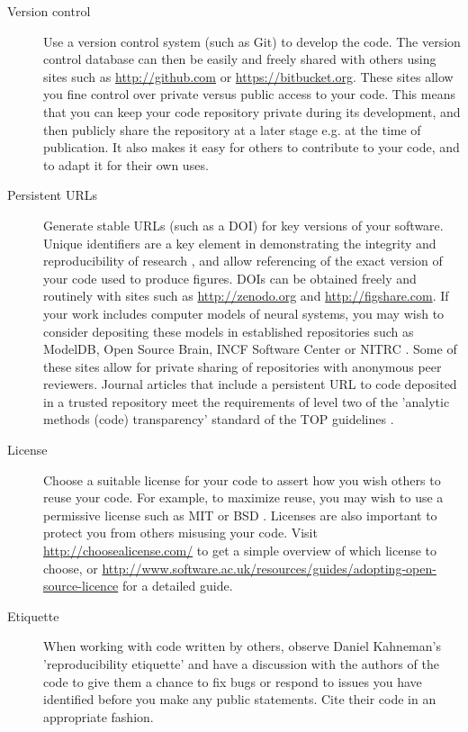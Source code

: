 \documentclass[11pt]{article}
\begin{document}
\begin{description}
\item [Version control] Use a version control system (such as Git) to
  develop the code.  The version control database can then be easily
  and freely shared with others using sites such as
  \url{http://github.com} \cite{Ram2013} or
  \url{https://bitbucket.org}.  These sites allow you fine control
  over private versus public access to your code.  This means that you
  can keep your code repository private during its development, and
  then publicly share the repository at a later stage e.g. at the time
  of publication. It also makes it easy for others to contribute to your code, and to adapt it for their own uses. 

\item [Persistent URLs] Generate stable URLs (such as a DOI) for key
  versions of your software.  Unique identifiers are a key element in
  demonstrating the integrity and reproducibility of research
  \cite{vasilevsky2013reproducibility}, and allow referencing of the 
  exact version of your code used to produce figures. DOIs can be
  obtained freely and routinely with sites such as
  \url{http://zenodo.org} and \url{http://figshare.com}.  If your work
  includes computer models of neural systems, you may wish to consider
  depositing these models in established repositories such as
  ModelDB\cite{modeldb}, Open Source Brain\cite{osb}, INCF
  Software Center\cite{web:incf-software} or NITRC
  \cite{poline_software_2014}. Some of these sites allow for private
  sharing of repositories with anonymous peer reviewers. Journal
  articles that include a persistent URL to code deposited in a
  trusted repository meet the requirements of level two of the
  'analytic methods (code) transparency' standard of the TOP
  guidelines \cite{Nosek2015}.


\item [License] Choose a suitable license for your code to assert how
  you wish others to reuse your code.  For example, to maximize reuse,
  you may wish to use a permissive license such as MIT or BSD
  \cite{stodden2009enabling}.  Licenses are also important to protect you from
  others misusing your code.  Visit \url{http://choosealicense.com/}
  to get a simple overview of which license to choose, or 
  \url{http://www.software.ac.uk/resources/guides/adopting-open-source-licence}
  for a detailed guide.

\item [Etiquette] When working with code written by others, observe
  Daniel Kahneman's 'reproducibility etiquette'\cite{Kahneman2014} and
  have a discussion with the authors of the code to give them a chance
  to fix bugs or respond to issues you have identified before you make
  any public statements.  Cite their code in an appropriate fashion.



\end{description}
\end{document}
